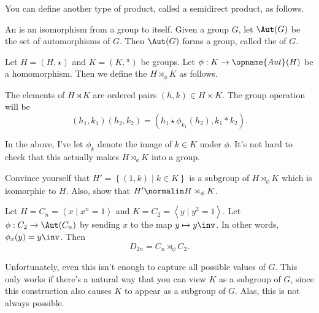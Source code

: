 You can define another type of product, called a semidirect product, as follows.
\begin{definition}
	An  is an isomorphism from a group to itself.
	Given a group $G$, let $\Aut(G)$ be the set of automorphisms of $G$.
	Then $\Aut(G)$ forms a group, called the  of $G$.
\end{definition}
\begin{definition}
	Let $H = (H, \star)$ and $K = (K, \ast)$ be groups.
	Let $\phi : K \to \opname{Aut}(H)$ be a homomorphism.
	Then we define the  $H \rtimes_\phi K$ as follows.
	\begin{itemize}
		\ii The elements of $H \rtimes K$ are ordered pairs $(h,k) \in H \times K$.
		\ii The group operation will be
		\[ (h_1, k_1)(h_2, k_2)
			= \left( h_1 \star \phi_{k_1}(h_2), k_1 \ast k_2 \right). \]
	\end{itemize}
\end{definition}
In the above, I've let $\phi_k$ denote the image of $k \in K$ under $\phi$.
It's not hard to check that this actually makes $H \rtimes_\phi K$ into a group.
\begin{ques}
	Convince yourself that $H' = \left\{ (1,k) \mid k \in K \right\}$
	is a subgroup of $H \rtimes_\phi K$ which is isomorphic to $H$.
	Also, show that $H' \normalin H \rtimes_\phi K$.
\end{ques}
\begin{example}
	Let $H = C_n = \left<x \mid x^n=1\right>$ and $K = C_2 = \left<y \mid y^2=1\right>$.
	Let $\phi : C_2 \to \Aut(C_n)$ by sending $x$ to the map $y \mapsto y\inv$.
	In other words, $\phi_x(y) = y\inv$.
	Then \[ D_{2n} = C_n \rtimes_\phi C_2. \]
\end{example}

Unfortunately, even this isn't enough to capture all possible values of $G$.
This only works if there's a natural way that you can view $K$ as a subgroup of $G$, since this construction also causes $K$ to appear as a subgroup of $G$.
Alas, this is not always possible.
